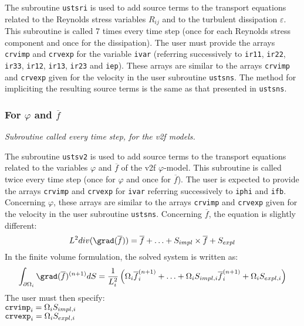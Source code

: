 {{{The subroutine \texttt{ustsri} is used to add source terms to the transport equations
related to the Reynolds stress variables $R_{ij}$ and to the turbulent
dissipation $\varepsilon$.
This subroutine is called 7 times every time step
(once for each Reynolds stress component and once for the
dissipation). The user must provide the arrays \texttt{crvimp} and
\texttt{crvexp} for the variable \texttt{ivar} (referring successively to
\texttt{ir11}, \texttt{ir22}, \texttt{ir33},
\texttt{ir12}, \texttt{ir13}, \texttt{ir23} and
\texttt{iep}). These arrays are similar to the arrays \texttt{crvimp}
and \texttt{crvexp} given for the velocity in the user subroutine
\texttt{ustsns}. The method for impliciting the resulting source terms is the
same as that presented in \texttt{ustsns}.

\subsubsection{For $\varphi$ and $\overline{f}$}
\label{prg_ustsv2}

\noindent
\textit{Subroutine called every time step, for the v2f models.}

The subroutine \texttt{ustsv2} is used to add source terms to the transport equations
related to the variables $\varphi$ and $\overline{f}$ of the v2f
$\varphi$-model. This subroutine is called twice
every time step (once for $\varphi$ and once for $\overline{f}$).
The user is expected to provide the arrays \texttt{crvimp} and
\texttt{crvexp} for \texttt{ivar} referring successively to \texttt{iphi}
and \texttt{ifb}. Concerning $\varphi$, these arrays are similar to the arrays
\texttt{crvimp} and \texttt{crvexp} given for the velocity in the user subroutine
\texttt{ustsns}. Concerning $\overline{f}$, the equation is slightly
different:
\begin{displaymath}
L^2 div(\grad(\overline{f})) = \overline{f} + \ldots + S_{impl}\times\overline{f}+S_{expl}
\end{displaymath}
In the finite volume formulation, the solved system is written as:
\begin{displaymath}
\int_{\partial\Omega_i}\grad(\overline{f})^{(n+1)}dS=\frac{1}{L_i^2}\left(
\Omega_i\overline{f}^{(n+1)}_i + \ldots +  \Omega_iS_{impl,i}\overline{f}_i^{(n+1)} +
\Omega_iS_{expl,i} \right)
\end{displaymath}
The user must then specify:\\
$\text{\texttt{crvimp}}_i=\Omega_iS_{impl,i}$\\
$\text{\texttt{crvexp}}_i=\Omega_iS_{expl,i}$

}}}
